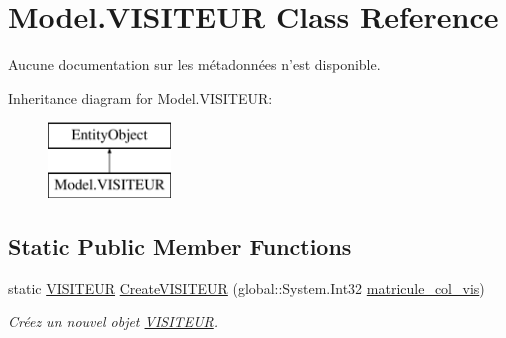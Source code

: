 \hypertarget{class_model_1_1_v_i_s_i_t_e_u_r}{\section{Model.\-V\-I\-S\-I\-T\-E\-U\-R Class Reference}
\label{class_model_1_1_v_i_s_i_t_e_u_r}
}


Aucune documentation sur les métadonnées n'est disponible.  


Inheritance diagram for Model.\-V\-I\-S\-I\-T\-E\-U\-R\-:\begin{figure}[H]
\begin{center}
\leavevmode
\includegraphics[height=2.000000cm]{class_model_1_1_v_i_s_i_t_e_u_r}
\end{center}
\end{figure}
\subsection*{Static Public Member Functions}
\begin{DoxyCompactItemize}
\item 
static \hyperlink{class_model_1_1_v_i_s_i_t_e_u_r}{V\-I\-S\-I\-T\-E\-U\-R} \hyperlink{class_model_1_1_v_i_s_i_t_e_u_r_a2c9761bc33dc5551daa65afe4e61701c}{Create\-V\-I\-S\-I\-T\-E\-U\-R} (global\-::\-System.\-Int32 \hyperlink{class_model_1_1_v_i_s_i_t_e_u_r_a8fe524ed5e9ea7a4fa823fbf14798843}{matricule\-\_\-col\-\_\-vis})
\begin{DoxyCompactList}\small\item\em Créez un nouvel objet \hyperlink{class_model_1_1_v_i_s_i_t_e_u_r}{V\-I\-S\-I\-T\-E\-U\-R}. \end{DoxyCompactList}\end{DoxyCompactItemize}
